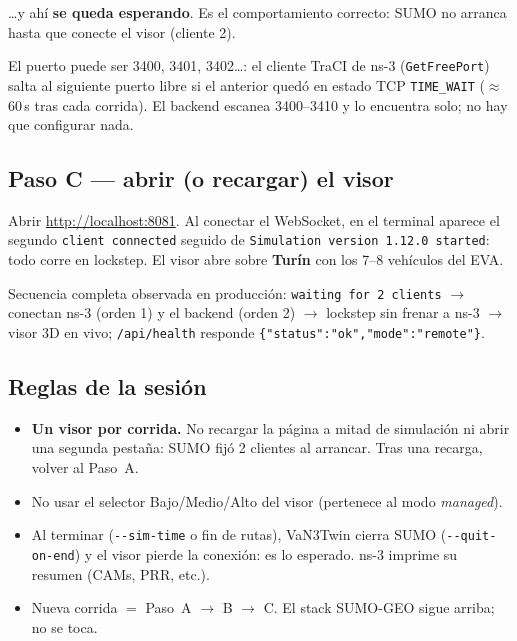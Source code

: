 \documentclass[11pt,a4paper]{article}
\begin{document}
\ldots{}y ahí \textbf{se queda esperando}. Es el comportamiento correcto: SUMO
no arranca hasta que conecte el visor (cliente 2).

\begin{notabox}
El puerto puede ser 3400, 3401, 3402\ldots{}: el cliente TraCI de ns-3
(\texttt{GetFreePort}) salta al siguiente puerto libre si el anterior quedó en
estado TCP \texttt{TIME\_WAIT} ($\approx$60\,s tras cada corrida). El backend
escanea 3400--3410 y lo encuentra solo; no hay que configurar nada.
\end{notabox}

\subsection*{Paso C --- abrir (o recargar) el visor}

\begin{ennavegador}
Abrir \url{http://localhost:8081}. Al conectar el WebSocket, en el terminal
aparece el segundo \texttt{client connected} seguido de
\texttt{Simulation version 1.12.0 started}: todo corre en lockstep. El visor
abre sobre \textbf{Turín} con los 7--8 vehículos del EVA.
\end{ennavegador}

\begin{validadobox}
Secuencia completa observada en producción: \texttt{waiting for 2 clients}
$\rightarrow$ conectan ns-3 (orden 1) y el backend (orden 2) $\rightarrow$
lockstep sin frenar a ns-3 $\rightarrow$ visor 3D en vivo;
\texttt{/api/health} responde
\texttt{\{"status":"ok","mode":"remote"\}}.
\end{validadobox}

\subsection*{Reglas de la sesión}

\begin{itemize}[leftmargin=1.6em, itemsep=2pt]
  \item \textbf{Un visor por corrida.} No recargar la página a mitad de
        simulación ni abrir una segunda pestaña: SUMO fijó 2 clientes al
        arrancar. Tras una recarga, volver al Paso~A.
  \item No usar el selector Bajo/Medio/Alto del visor (pertenece al modo
        \emph{managed}).
  \item Al terminar (\texttt{-{}-sim-time} o fin de rutas), VaN3Twin cierra
        SUMO (\texttt{-{}-quit-on-end}) y el visor pierde la conexión: es lo
        esperado. ns-3 imprime su resumen (CAMs, PRR, etc.).
  \item Nueva corrida $=$ Paso~A $\rightarrow$ B $\rightarrow$ C. El stack
        SUMO-GEO sigue arriba; no se toca.
\end{itemize}
\end{document}
